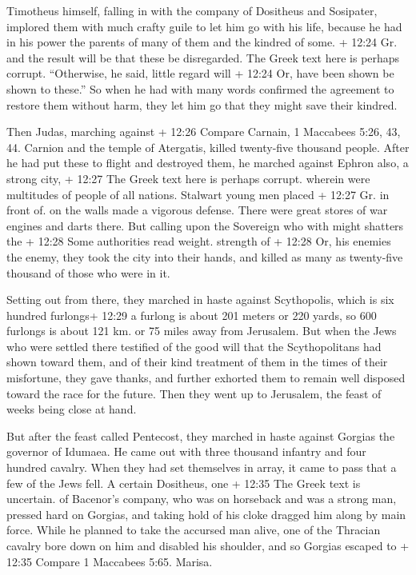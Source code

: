  Timotheus himself, falling in with the company of
Dositheus and Sosipater, implored them with much crafty guile to let him
go with his life, because he had in his power the parents of many of
them and the kindred of some. + 12:24 Gr. and the result will be that
these be disregarded. The Greek text here is perhaps corrupt.
``Otherwise, he said, little regard will + 12:24 Or, have been shown be
shown to these.''  So when he had with many words confirmed
the agreement to restore them without harm, they let him go that they
might save their kindred.

 Then Judas, marching against + 12:26 Compare Carnain, 1
Maccabees 5:26, 43, 44. Carnion and the temple of Atergatis, killed
twenty-five thousand people.  After he had put these to
flight and destroyed them, he marched against Ephron also, a strong
city, + 12:27 The Greek text here is perhaps corrupt. wherein were
multitudes of people of all nations. Stalwart young men placed + 12:27
Gr. in front of. on the walls made a vigorous defense. There were great
stores of war engines and darts there.  But calling upon
the Sovereign who with might shatters the + 12:28 Some authorities read
weight. strength of + 12:28 Or, his enemies the enemy, they took the
city into their hands, and killed as many as twenty-five thousand of
those who were in it.

 Setting out from there, they marched in haste against
Scythopolis, which is six hundred furlongs+ 12:29 a furlong is about 201
meters or 220 yards, so 600 furlongs is about 121 km. or 75 miles away
from Jerusalem.  But when the Jews who were settled there
testified of the good will that the Scythopolitans had shown toward
them, and of their kind treatment of them in the times of their
misfortune,  they gave thanks, and further exhorted them to
remain well disposed toward the race for the future. Then they went up
to Jerusalem, the feast of weeks being close at hand.

 But after the feast called Pentecost, they marched in
haste against Gorgias the governor of Idumaea.  He came out
with three thousand infantry and four hundred cavalry. 
When they had set themselves in array, it came to pass that a few of the
Jews fell.  A certain Dositheus, one + 12:35 The Greek text
is uncertain. of Bacenor's company, who was on horseback and was a
strong man, pressed hard on Gorgias, and taking hold of his cloke
dragged him along by main force. While he planned to take the accursed
man alive, one of the Thracian cavalry bore down on him and disabled his
shoulder, and so Gorgias escaped to + 12:35 Compare 1 Maccabees 5:65.
Marisa.

